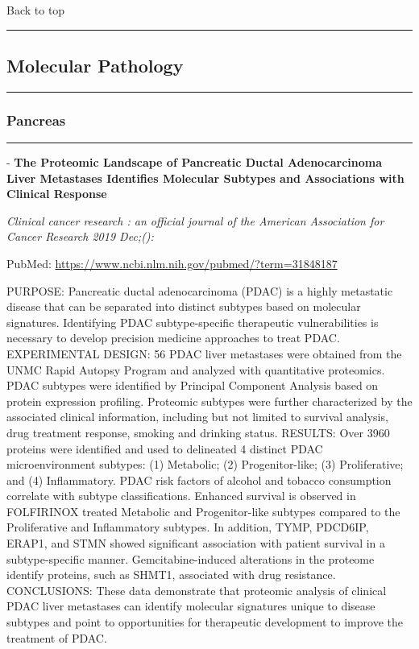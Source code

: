\documentclass[
]{article}
\renewcommand{\linethickness}{0.05em}
\begin{document}
Back to top

\begin{center}\rule{0.5\linewidth}{\linethickness}\end{center}

\pagebreak

\hypertarget{molecular}{%
\subsection{Molecular Pathology}\label{molecular}}

\begin{center}\rule{0.5\linewidth}{\linethickness}\end{center}

\hypertarget{pancreas_molecular}{%
\subsubsection{Pancreas}\label{pancreas_molecular}}

\begin{center}\rule{0.5\linewidth}{\linethickness}\end{center}

- \textbf{The Proteomic Landscape of Pancreatic Ductal Adenocarcinoma
Liver Metastases Identifies Molecular Subtypes and Associations with
Clinical Response}

\emph{Clinical cancer research : an official journal of the American
Association for Cancer Research 2019 Dec;():}

PubMed: \url{https://www.ncbi.nlm.nih.gov/pubmed/?term=31848187}

PURPOSE: Pancreatic ductal adenocarcinoma (PDAC) is a highly metastatic
disease that can be separated into distinct subtypes based on molecular
signatures. Identifying PDAC subtype-specific therapeutic
vulnerabilities is necessary to develop precision medicine approaches to
treat PDAC. EXPERIMENTAL DESIGN: 56 PDAC liver metastases were obtained
from the UNMC Rapid Autopsy Program and analyzed with quantitative
proteomics. PDAC subtypes were identified by Principal Component
Analysis based on protein expression profiling. Proteomic subtypes were
further characterized by the associated clinical information, including
but not limited to survival analysis, drug treatment response, smoking
and drinking status. RESULTS: Over 3960 proteins were identified and
used to delineated 4 distinct PDAC microenvironment subtypes: (1)
Metabolic; (2) Progenitor-like; (3) Proliferative; and (4) Inflammatory.
PDAC risk factors of alcohol and tobacco consumption correlate with
subtype classifications. Enhanced survival is observed in FOLFIRINOX
treated Metabolic and Progenitor-like subtypes compared to the
Proliferative and Inflammatory subtypes. In addition, TYMP, PDCD6IP,
ERAP1, and STMN showed significant association with patient survival in
a subtype-specific manner. Gemcitabine-induced alterations in the
proteome identify proteins, such as SHMT1, associated with drug
resistance. CONCLUSIONS: These data demonstrate that proteomic analysis
of clinical PDAC liver metastases can identify molecular signatures
unique to disease subtypes and point to opportunities for therapeutic
development to improve the treatment of PDAC.
\end{document}

